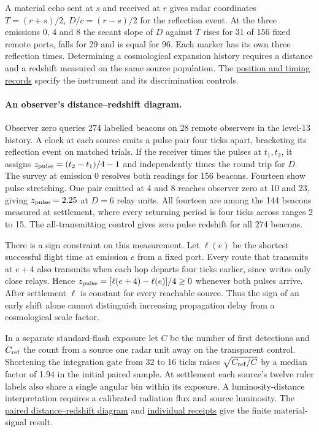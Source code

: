 \documentclass[11pt]{article}
\theoremstyle{remark}
\begin{document}
A material echo sent at $s$ and received at $r$ gives radar coordinates
$T=(r+s)/2$, $D/c=(r-s)/2$ for the reflection event. At the three
emissions 0, 4 and 8 the secant slope of $D$ against $T$ rises for 31
of 156 fixed remote ports, falls for 29 and is equal for 96. Each marker
has its own three reflection times. Determining a cosmological expansion
history requires a distance and a redshift measured on the same source
population. The
\href{https://dovybzrnzxfo1.cloudfront.net/analysis/observer_zero_information.json}{position
and timing records} specify the instrument and its discrimination controls.

\paragraph{An observer's distance--redshift diagram.}
Observer zero queries 274 labelled beacons on 28 remote observers in the
level-13 history. A clock at each source emits a pulse pair four ticks
apart, bracketing its reflection event on matched trials. If the receiver
times the pulses at $t_1,t_2$, it assigns $z_{\rm pulse}=(t_2-t_1)/4-1$
and independently times the round trip for $D$. The survey at emission
0 resolves both readings for 156 beacons. Fourteen show pulse stretching.
One pair emitted at 4 and 8 reaches observer zero at 10 and 23, giving
$z_{\rm pulse}=2.25$ at $D=6$ relay units. All fourteen are among the
144 beacons measured at settlement, where every returning period is four
ticks across ranges 2 to 15. The all-transmitting control gives zero
pulse redshift for all 274 beacons.

There is a sign constraint on this measurement. Let $\ell(e)$ be the
shortest successful flight time at emission $e$ from a fixed port. Every
route that transmits at $e+4$ also transmits when each hop departs four
ticks earlier, since writes only close relays. Hence
$z_{\rm pulse}=[\ell(e+4)-\ell(e)]/4\geq 0$ whenever both pulses arrive.
After settlement $\ell$ is constant for every reachable source. Thus the
sign of an early shift alone cannot distinguish increasing propagation
delay from a cosmological scale factor.

In a separate standard-flash exposure let $C$ be the number of first
detections and $C_{\rm ref}$ the count from a source one radar unit away
on the transparent control. Shortening the integration gate from 32 to
16 ticks raises $\sqrt{C_{\rm ref}/C}$ by a median factor of 1.94 in the
initial paired sample. At settlement each source's twelve ruler labels
also share a single angular bin within its exposure. A luminosity-distance
interpretation requires a calibrated radiation flux and source luminosity.
The \href{https://dovybzrnzxfo1.cloudfront.net/analysis/distance_redshift.png}{paired
distance--redshift diagram} and
\href{https://dovybzrnzxfo1.cloudfront.net/analysis/distance_redshift.json}{individual
receipts} give the finite material-signal result.
\end{document}
